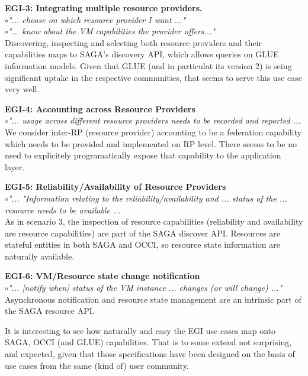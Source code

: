 \documentclass[10pt,conference,final,letterpaper,twoside,twocolumn,]{IEEEtran}
\newcommand{\I}[1]{\textit{#1}}
\newcommand{\B}[1]{\textbf{#1}}
\newcommand{\bull}{$\circ$}
\begin{document}
  \noindent
  \B{EGI-3: Integrating multiple resource providers.}\\
  \bull \I{"... choose on which resource provider I want ..."}\\
  \bull \I{"... know about the VM capabilities the provider offers..."}\\
  Discovering, inspecting and selecting both resource providers and
  their capabilities maps to SAGA's discovery API, which allows
  queries on GLUE information models.  Given that GLUE (and in
  particulat its version 2) is seing significant uptake in the
  respective communities, that seems to serve this use case very well.  

  \noindent
  \B{EGI-4: Accounting across Resource Providers}\\
  \bull \I{"... usage across different resource providers needs to be
  recorded and reported ... }\\
  We consider inter-RP (resource provider) accounting to be a federation 
  capability which needs to be provided and implemented on RP level.
  There seems to be no need to explicitely programatically expose that 
  capability to the application layer.

  \noindent
  \B{EGI-5: Reliability/Availability of Resource Providers}\\
  \bull \I{"... "Information relating to the reliability/availability 
  and ... status of the ... resource needs to be available ...}\\
  As in scenario 3, the inspection of resource capabilities
  (reliability and availability are resource capabilities) are part of
  the SAGA discover API.  Resources are stateful entities in both SAGA
  and OCCI, so resource state information are naturally available.

  \noindent
  \B{EGI-6: VM/Resource state change notification}\\
  \bull \I{"... [notify when] status of the VM instance ...
  changes (or will change) ..."}\\ 
  Asynchronous notification and resource state management are an
  intrinsic part of the SAGA resource API.

  It is interesting to see how naturally and easy the EGI use cases
  map onto SAGA, OCCI (and GLUE) capabilities.  That is to some extend
  not surprising, and expected, given that those specifications have
  been designed on the basis of use cases from the same (kind of) user
  community.
\end{document}
